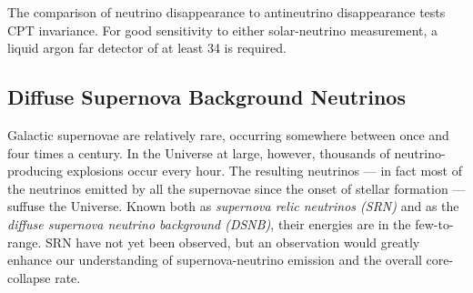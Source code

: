 %

The comparison
of neutrino disappearance to antineutrino disappearance tests CPT
invariance. For good sensitivity to either solar-neutrino measurement,
a liquid argon far detector of at least \SI{34}{\kt} is required.


\subsection{Diffuse Supernova Background Neutrinos}

Galactic supernovae are relatively rare, occurring somewhere between
once and four times a century. In the Universe
at large, however, thousands of neutrino-producing explosions occur
every hour.  The resulting neutrinos --- in fact most of the neutrinos
emitted by all the supernovae since the onset of stellar formation ---
suffuse the Universe.  Known both as \emph{supernova relic neutrinos
  (SRN)} and as the \emph{diffuse supernova neutrino background
  (DSNB)}, their energies are in the few-to- range.  SRN
have not yet been observed, but an observation would greatly enhance
our understanding of supernova-neutrino emission and the overall
core-collapse rate.


